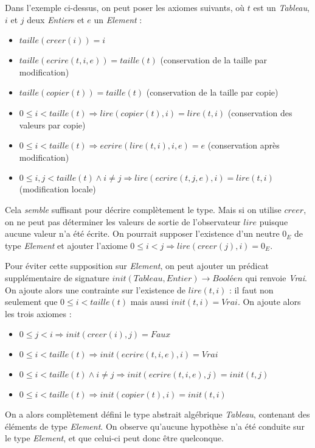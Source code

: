 \documentclass[../../../main.tex]{subfiles}
\begin{document}
Dans l'exemple ci-dessus, on peut poser les axiomes suivants, où $t$ est un \textit{Tableau}, $i$ et $j$ deux \textit{Entier}s et $e$ un \textit{Element} : 
\begin{itemize}
	\item $taille(creer(i)) = i$
	\item $taille(ecrire(t, i, e)) = taille(t)$ (conservation de la taille par modification)

	\item $taille(copier(t)) = taille(t)$ (conservation de la taille par copie)
	\item $0\leq i < taille(t) \Rightarrow lire(copier(t), i) = lire(t, i)$ (conservation des valeurs par copie)
	
	\item $0\leq i < taille(t) \Rightarrow ecrire(lire(t, i), i, e) = e$ (conservation après modification)
	\item $0\leq i, j < taille(t) \wedge i \neq j \Rightarrow lire(ecrire(t, j, e), i) = lire(t, i)$ (modification locale)
\end{itemize}
Cela \textit{semble} suffisant pour décrire complètement le type. Mais si on utilise $creer$, on ne peut pas déterminer les valeurs de sortie de l'observateur $lire$ puisque aucune valeur n'a été écrite. On pourrait supposer l'existence d'un neutre $0_E$ de type \textit{Element} et ajouter l'axiome $0\leq i < j \Rightarrow lire(creer(j), i) = 0_E$.

Pour éviter cette supposition sur \textit{Element}, on peut ajouter un prédicat supplémentaire de signature $init(Tableau, Entier) \rightarrow \textit{Booléen}$ qui renvoie \textit{Vrai}. On ajoute alors une contrainte sur l'existence de $lire(t, i)$ : il faut non seulement que $0\leq i < taille(t)$ mais aussi $init(t, i) = Vrai$. On ajoute alors les trois axiomes :
\begin{itemize}
	\item $0\leq j < i \Rightarrow init(creer(i), j) = Faux$
	\item $0\leq i < taille(t) \Rightarrow init(ecrire(t, i, e), i) = Vrai$
	\item $0\leq i < taille(t) \wedge i\neq j \Rightarrow init(ecrire(t, i, e), j) = init(t, j)$
	\item $0\leq i < taille(t) \Rightarrow init(copier(t), i) = init(t, i)$
\end{itemize}
On a alors complètement défini le type abstrait algébrique \textit{Tableau}, contenant des éléments de type \textit{Element}. On observe qu'aucune hypothèse n'a été conduite sur le type \textit{Element}, et que celui-ci peut donc être quelconque.
\end{document}
